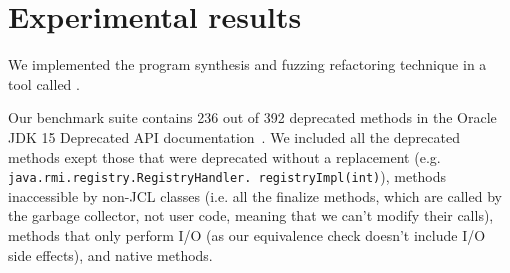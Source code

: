 \documentclass[10pt,conference]{IEEEtran}
\begin{document}




\section{Experimental results}\label{sec:experimental-results}

We implemented the program synthesis and fuzzing refactoring technique in a tool called \tool.

Our benchmark suite contains 236 out of 392 deprecated methods in the Oracle
JDK 15 Deprecated API documentation~\cite{OracleJdk15DeprecatedAPI}.
We included all the deprecated methods exept those that were deprecated without a replacement
(e.g. \texttt{java.rmi.registry.RegistryHandler.\ registryImpl(int)}), 
methods inaccessible by non-JCL classes (i.e. all the finalize methods, which are called by the garbage collector, not user code, meaning that we can't modify their calls), 
methods that only perform I/O (as our equivalence check doesn't include I/O side effects),
and native methods.
\end{document}
